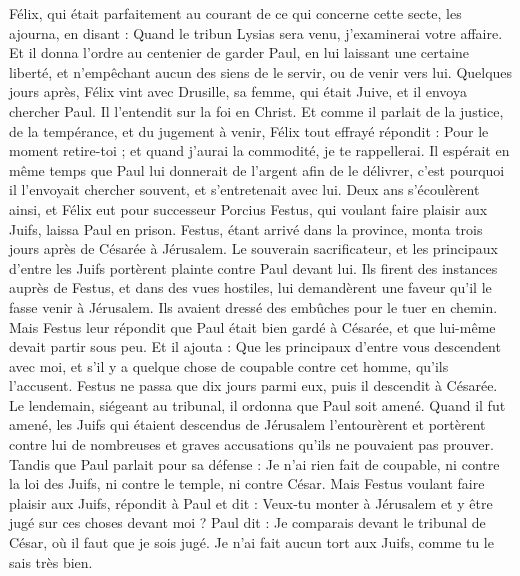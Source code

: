 \begin{multicols}{2}
Félix, qui était parfaitement au courant de ce qui concerne cette secte, les ajourna, en disant : Quand le tribun Lysias sera venu, j’examinerai votre affaire.
Et il donna l’ordre au centenier de garder Paul, en lui laissant une certaine liberté, et n'empêchant aucun des siens de le servir, ou de venir vers lui.
Quelques jours après, Félix vint avec Drusille, sa femme, qui était Juive, et il envoya chercher Paul. Il l’entendit sur la foi en Christ.
Et comme il parlait de la justice, de la tempérance, et du jugement à venir, Félix tout effrayé répondit : Pour le moment retire-toi ; et quand j'aurai la commodité, je te rappellerai.
Il espérait en même temps que Paul lui donnerait de l’argent afin de le délivrer, c'est pourquoi il l'envoyait chercher souvent, et s'entretenait avec lui.
Deux ans s’écoulèrent ainsi, et Félix eut pour successeur Porcius Festus, qui voulant faire plaisir aux Juifs, laissa Paul en prison.
\VerseOne{}Festus, étant arrivé dans la province, monta trois jours après de Césarée à Jérusalem.
Le souverain sacrificateur, et les principaux d'entre les Juifs portèrent plainte contre Paul devant lui. Ils firent des instances auprès de Festus, et dans des vues hostiles,
lui demandèrent une faveur qu’il le fasse venir à Jérusalem. Ils avaient dressé des embûches pour le tuer en chemin.
Mais Festus leur répondit que Paul était bien gardé à Césarée, et que lui-même devait partir sous peu.
Et il ajouta : Que les principaux d’entre vous descendent avec moi, et s’il y a quelque chose de coupable contre cet homme, qu’ils l’accusent.
Festus ne passa que dix jours parmi eux, puis il descendit à Césarée. Le lendemain, siégeant au tribunal, il ordonna que Paul soit amené.
Quand il fut amené, les Juifs qui étaient descendus de Jérusalem l’entourèrent et portèrent contre lui de nombreuses et graves accusations qu’ils ne pouvaient pas prouver.
Tandis que Paul parlait pour sa défense : Je n’ai rien fait de coupable, ni contre la loi des Juifs, ni contre le temple, ni contre César.
Mais Festus voulant faire plaisir aux Juifs, répondit à Paul et dit : Veux-tu monter à Jérusalem et y être jugé sur ces choses devant moi ?
Paul dit : Je comparais devant le tribunal de César, où il faut que je sois jugé. Je n'ai fait aucun tort aux Juifs, comme tu le sais très bien.

\end{multicols}
